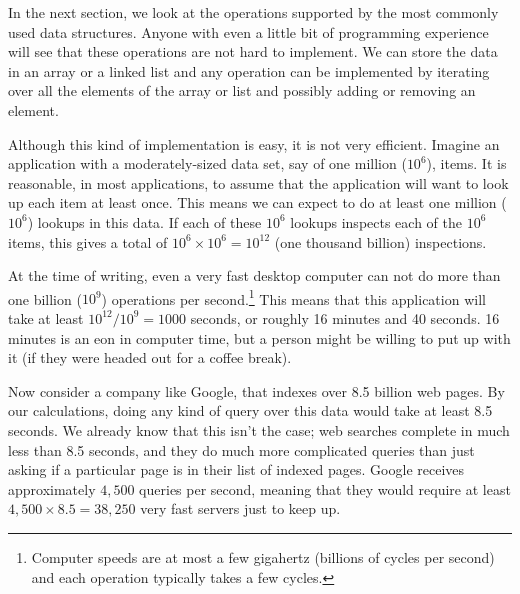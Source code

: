 In the next section, we look at the operations supported by the
most commonly used data structures.  Anyone with even a little bit of
programming experience will see that these operations are not hard to
implement.  We can store the data in an array or a linked list and any
operation can be implemented by iterating over all the elements of the
array or list and possibly adding or removing an element.

Although this kind of implementation is easy, it is not very efficient.
Imagine an application with a moderately-sized data set, say of one
million ($10^6$), items.  It is reasonable, in most applications, to
assume that the application will want to look up each item at least once.
This means we can expect to do at least one million ($10^6$) lookups in
this data.  If each of these $10^6$ lookups inspects  each of the $10^6$
items, this gives a total of $10^6\times 10^6=10^{12}$ (one thousand
billion) inspections.

At the time of writing, even a very fast desktop computer can not do more
than one billion ($10^9$) operations per second.\footnote{Computer speeds
are at most a few gigahertz (billions of cycles per second) and each
operation typically takes a few cycles.} This means that this application
will take at least $10^{12}/10^9 = 1000$ seconds, or roughly 16 minutes
and 40 seconds.  16 minutes is an eon in computer time, but a person might
be willing to put up with it (if they were headed out for a coffee break).


Now consider a company like Google, that indexes over 8.5 billion
web pages.  By our calculations, doing any kind of query over this data
would take at least 8.5 seconds.  We already know that this isn't the
case; web searches complete in much less than 8.5 seconds, and they do
much more complicated queries than just asking if a particular page is
in their list of indexed pages.  Google receives approximately $4,500$
queries per second, meaning that they would require at least $4,500\times
8.5=38,250$ very fast servers just to keep up.

